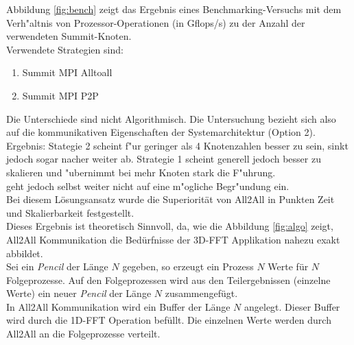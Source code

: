Abbildung \ref{fig:bench} zeigt das Ergebnis eines Benchmarking-Versuchs mit dem Verh"altnis von Prozessor-Operationen (in Gflops/s) zu der Anzahl der verwendeten Summit-Knoten.\\
Verwendete Strategien sind:
\begin{enumerate}
	\item Summit MPI Alltoall
	\item Summit MPI P2P
\end{enumerate}
Die Unterschiede sind nicht Algorithmisch. Die Untersuchung bezieht sich also auf die kommunikativen Eigenschaften der Systemarchitektur (Option 2).\\
Ergebnis: Stategie 2 scheint f"ur geringer als 4 Knotenzahlen besser zu sein, sinkt jedoch sogar nacher weiter ab.
Strategie 1 scheint generell jedoch besser zu skalieren und "ubernimmt bei mehr Knoten stark die F"uhrung.\\
\cite{mainpaper} geht jedoch selbst weiter nicht auf eine m"ogliche Begr"undung ein.\\
Bei diesem Lösungsansatz wurde die Superiorität von All2All in Punkten Zeit und Skalierbarkeit festgestellt.\\
Dieses Ergebnis ist theoretisch Sinnvoll, da, wie die Abbildung \ref{fig:algo} zeigt, All2All Kommunikation die Bedürfnisse der 3D-FFT Applikation nahezu exakt abbildet.\\
Sei ein \textit{Pencil} der Länge $N$ gegeben, so erzeugt ein Prozess $N$ Werte für $N$ Folgeprozesse. Auf den Folgeprozessen wird aus den Teilergebnissen (einzelne Werte) ein neuer \textit{Pencil} der Länge $N$ zusammengefügt.\\
In All2All Kommunikation wird ein Buffer der Länge $N$ angelegt. Dieser Buffer wird durch die 1D-FFT Operation befüllt. Die einzelnen Werte werden durch All2All an die Folgeprozesse verteilt.


